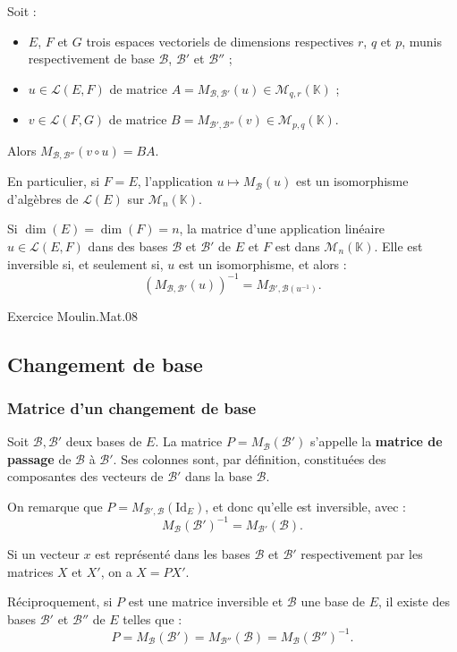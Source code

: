 \documentclass[french]{article}
\newcommand{\K}{\mathbb{K}}
\newcommand{\inv}{^{-1}}
\theoremstyle{plain}
\theoremstyle{definition}
\theoremstyle{remark}
\begin{document}
Soit :
\begin{itemize}
	\item $E$, $F$ et $G$ trois espaces vectoriels de dimensions respectives $r$, $q$ et $p$, munis respectivement de base $\mathcal{B}$, $\mathcal{B}'$ et $\mathcal{B}''$ ;
	\item $u\in\mathcal{L}(E,F)$ de matrice $A=M_{\mathcal{B},\mathcal{B}'}(u)\in\mathcal{M}_{q,r}(\K)$ ;
	\item $v\in\mathcal{L}(F,G)$ de matrice $B=M_{\mathcal{B}',\mathcal{B}''}(v)\in\mathcal{M}_{p,q}(\K)$.
\end{itemize}
Alors $M_{\mathcal{B},\mathcal{B}''}(v\circ u)=BA$.

En particulier, si $F=E$, l'application $u\mapsto M_\mathcal{B}(u)$ est un isomorphisme d'algèbres de $\mathcal{L}(E)$ sur $\mathcal{M}_n(\K)$.

Si $\dim(E)=\dim(F)=n$, la matrice d'une application linéaire $u\in\mathcal{L}(E,F)$ dans des bases $\mathcal{B}$ et $\mathcal{B}'$ de $E$ et $F$ est dans $\mathcal{M}_n(\K)$. Elle est inversible si, et seulement si, $u$ est un isomorphisme, et alors :
$$(M_{\mathcal{B},\mathcal{B}'}(u))\inv=M_{\mathcal{B}',\mathcal{B}(u\inv)}.$$

Exercice Moulin.Mat.08

\subsection{Changement de base}

\subsubsection*{Matrice d'un changement de base}

Soit $\mathcal{B},\mathcal{B}'$ deux bases de $E$. La matrice $P=M_{\mathcal{B}}(\mathcal{B}')$ s'appelle la \textbf{matrice de passage} de $\mathcal{B}$ à $\mathcal{B}'$. Ses colonnes sont, par définition, constituées des composantes des vecteurs de $\mathcal{B}'$ dans la base $\mathcal{B}$.

On remarque que $P=M_{\mathcal{B}',\mathcal{B}}(\text{Id}_E)$, et donc qu'elle est inversible, avec :
$$M_{\mathcal{B}}(\mathcal{B}')\inv=M_{\mathcal{B}'}(\mathcal{B}).$$

Si un vecteur $x$ est représenté dans les bases $\mathcal{B}$ et $\mathcal{B}'$ respectivement par les matrices $X$ et $X'$, on a $X=PX'$.

Réciproquement, si $P$ est une matrice inversible et $\mathcal{B}$ une base de $E$, il existe des bases $\mathcal{B}'$ et $\mathcal{B}''$ de $E$ telles que :
$$P=M_{\mathcal{B}}(\mathcal{B}')=M_{\mathcal{B}''}(\mathcal{B})=M_\mathcal{B}(\mathcal{B}'')\inv.$$
\end{document}
